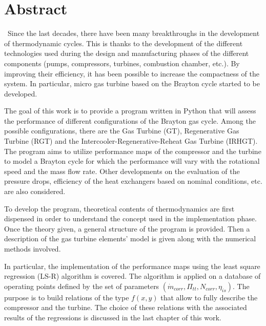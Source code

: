 \chapter*{Abstract}
\quad\ Since the last decades, there have been many breakthroughs in the development of thermodynamic cycles. This is thanks to the development of the different technologies used during the design and manufacturing phases of the different components (pumps, compressors, turbines, combustion chamber, etc.). By improving their efficiency, it has been possible to increase the compactness of the system. In particular, micro gas turbine based on the Brayton cycle started to be developed. 

The goal of this work is to provide a program written in Python that will assess the performance of different configurations of the Brayton gas cycle. Among the possible configurations, there are the Gas Turbine (GT), Regenerative Gas Turbine (RGT) and the Intercooler-Regenerative-Reheat Gas Turbine (IRHGT).  The program aims to utilize performance maps of the compressor and the   turbine to model a Brayton cycle for which the performance will vary with the rotational speed and the mass flow rate. Other developments on the evaluation of the pressure drops, efficiency of the heat exchangers based on nominal conditions, etc. are also considered.

To develop the program, theoretical contents of thermodynamics are first dispensed in order to understand the concept used in the implementation phase. Once the theory given, a general structure of the program is provided. Then a description of the gas turbine elements' model is given along with the numerical methods involved. 

In particular, the implementation of the performance maps using the least square regression (LS-R) algorithm is covered. The algorithm is applied on a database of operating points defined by the set of parameters $(\dot{m}_{corr},\Pi_{tt},N_{corr},\eta_{is})$. The purpose is to build relations of the type $f(x,y)$ that allow to fully describe the compressor and the turbine. The choice of these relations with the associated results of the regressions is discussed in the last chapter of this work.
